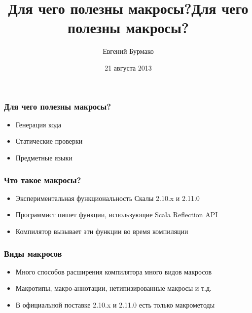 \documentclass[svgnames,hyperref={bookmarks=false},11pt]{beamer}
\title{Для чего полезны макросы?}
\begin{document}
\title{Для чего полезны макросы?}
\author{Евгений Бурмако}
\date{21 августа 2013}
{
\begin{frame}
  \titlepage
\end{frame}
}

\begin{frame}[fragile]
\frametitle{Для чего полезны макросы?}

\begin{itemize}
\item Генерация кода
\item Статические проверки
\item Предметные языки
\end{itemize}
\end{frame}

\begin{frame}[fragile]
\frametitle{}

\vskip40pt
\begin{center}
\end{center}
\end{frame}

\begin{frame}[fragile]
\frametitle{Что такое макросы?}

\begin{itemize}
\item Экспериментальная функциональность Скалы 2.10.x и 2.11.0
\item Программист пишет функции, использующие Scala Reflection API
\item Компилятор вызывает эти функции во время компиляции
\end{itemize}
\end{frame}

\begin{frame}[fragile]
\frametitle{Виды макросов}

\begin{itemize}
\item Много способов расширения компилятора \text{\textrightarrow} много видов макросов
\item Макротипы, макро-аннотации, нетипизированные макросы и т.д.
\item В официальной поставке 2.10.x и 2.11.0 есть только макрометоды
\end{itemize}
\end{frame}
\end{document}
